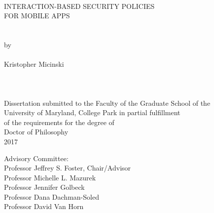 
\thispagestyle{empty}
\hbox{\ }
\vspace{1in}
\renewcommand{\baselinestretch}{1}
\small\normalsize
\begin{center}

\large{{INTERACTION-BASED SECURITY POLICIES\\ FOR MOBILE APPS}}\\
\ \\
\ \\
\large{by} \\
\ \\
\large{Kristopher Micinski}%
\ \\
\ \\
\ \\
\ \\
\normalsize
Dissertation submitted to the Faculty of the Graduate School of the \\
University of Maryland, College Park in partial fulfillment \\
of the requirements for the degree of \\
Doctor of Philosophy \\
2017
\end{center}

\vspace{7.5em}

\noindent Advisory Committee: \\
Professor Jeffrey S. Foster, Chair/Advisor \\
Professor Michelle L. Mazurek \\
Professor Jennifer Golbeck \\
Professor Dana Dachman-Soled \\
Professor David Van Horn
